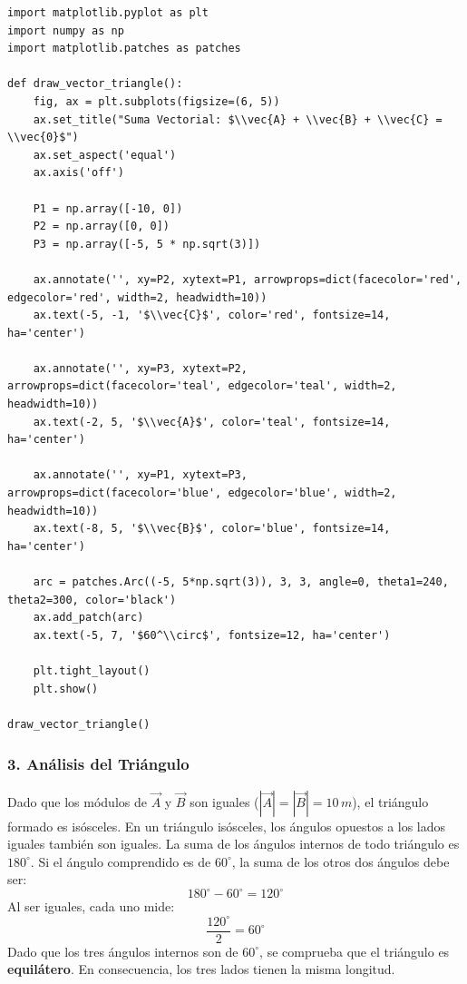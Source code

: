 \documentclass[12pt, a4paper]{article}
\begin{document}
\begin{lstlisting}
import matplotlib.pyplot as plt
import numpy as np
import matplotlib.patches as patches

def draw_vector_triangle():
    fig, ax = plt.subplots(figsize=(6, 5))
    ax.set_title("Suma Vectorial: $\\vec{A} + \\vec{B} + \\vec{C} = \\vec{0}$")
    ax.set_aspect('equal')
    ax.axis('off')

    P1 = np.array([-10, 0])
    P2 = np.array([0, 0])
    P3 = np.array([-5, 5 * np.sqrt(3)])

    ax.annotate('', xy=P2, xytext=P1, arrowprops=dict(facecolor='red', edgecolor='red', width=2, headwidth=10))
    ax.text(-5, -1, '$\\vec{C}$', color='red', fontsize=14, ha='center')

    ax.annotate('', xy=P3, xytext=P2, arrowprops=dict(facecolor='teal', edgecolor='teal', width=2, headwidth=10))
    ax.text(-2, 5, '$\\vec{A}$', color='teal', fontsize=14, ha='center')

    ax.annotate('', xy=P1, xytext=P3, arrowprops=dict(facecolor='blue', edgecolor='blue', width=2, headwidth=10))
    ax.text(-8, 5, '$\\vec{B}$', color='blue', fontsize=14, ha='center')

    arc = patches.Arc((-5, 5*np.sqrt(3)), 3, 3, angle=0, theta1=240, theta2=300, color='black')
    ax.add_patch(arc)
    ax.text(-5, 7, '$60^\\circ$', fontsize=12, ha='center')

    plt.tight_layout()
    plt.show()

draw_vector_triangle()
\end{lstlisting}

\subsubsection*{3. Análisis del Triángulo}
Dado que los módulos de $\vec{A}$ y $\vec{B}$ son iguales ($|\vec{A}| = |\vec{B}| = 10 \, \si{m}$), el triángulo formado es isósceles. 
En un triángulo isósceles, los ángulos opuestos a los lados iguales también son iguales. La suma de los ángulos internos de todo triángulo es $180^\circ$. Si el ángulo comprendido es de $60^\circ$, la suma de los otros dos ángulos debe ser:
$$180^\circ - 60^\circ = 120^\circ$$
Al ser iguales, cada uno mide:
$$\frac{120^\circ}{2} = 60^\circ$$
Dado que los tres ángulos internos son de $60^\circ$, se comprueba que el triángulo es \textbf{equilátero}. En consecuencia, los tres lados tienen la misma longitud.
\end{document}
